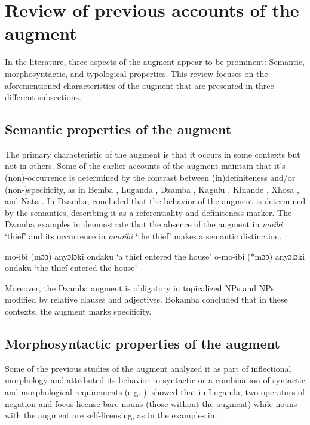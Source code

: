 \documentclass[output=paper]{langscibook}
\begin{document}
\section{Review of previous accounts of the augment}\label{sec:choti:2}
In the literature, three aspects of the augment appear to be prominent: Semantic, morphosyntactic, and typological properties. This review focuses on the aforementioned characteristics of the augment that are presented in three different subsections.

\subsection{Semantic properties of the augment} 
The primary characteristic of the augment is that it occurs in some contexts but not in others. Some of the earlier accounts of the augment maintain that it's (non)-occurrence is determined by the contrast between (in)definiteness and/or (non-)specificity, as in Bemba \citep{givon1972studies},  Luganda \citep{ashton1987luganda,ferrari2009,mould1974syntax}, Dzamba \citep{bokamba1971specificity},  Kagulu \citep{petzell2003function}, Kinande \citep{progovac1993non}, Xhosa \citep{visser2008definiteness},  and Nata \citep{gambarage2013pre,gambarage2019belief}. In Dzamba, \citet[220]{bokamba1971specificity} concluded that the behavior of the augment is determined by the semantics, describing it as a referentiality and definiteness marker. The Dzamba examples in  demonstrate that the absence of the augment in \textit{moibi} ‘thief’  and its occurrence in \textit{omoibi} ‘the thief’  makes a semantic distinction. 

\begin{exe}
\ex \label{hayagusii3}
\begin{xlist}
\ex\label{ex:choti:3a} mo-ibi (mɔɔ) anyɔlɔki  ondaku
\glt ‘a thief entered the house’
\ex\label{ex:choti:3b}o-mo-ibi (*mɔɔ) anyɔlɔki    ondaku
\glt ‘the thief entered the house’ 
\end{xlist}
\end{exe}
Moreover, the Dzamba augment is obligatory in topicalized NPs and NPs modified by relative clauses and adjectives. Bokamba concluded that in these contexts, the augment marks specificity.

\subsection{Morphosyntactic properties of the augment}
Some of the previous studies of the augment analyzed it as part of inflectional morphology and attributed its behavior to syntactic or a combination of syntactic and morphological requirements  (e.g. \citealt{dewees1971role,hyman1993augment,mould1974syntax}). \citet[224]{hyman1993augment} showed that in Luganda, two operators of negation and focus license bare nouns (those without the augment) while nouns with the augment are self-licensing, as in the examples in :
\end{document}
